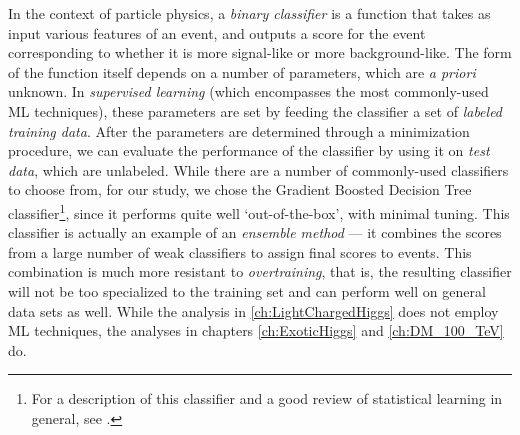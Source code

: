 In the context of particle physics, a \emph{binary classifier} is a function that takes as input various features of an event, and outputs a score for the event corresponding to whether it is more signal-like or more background-like. The form of the function itself depends on a number of parameters, which are \emph{a priori} unknown. In \emph{supervised learning} (which encompasses the most commonly-used ML techniques), these parameters are set by feeding the classifier a set of \emph{labeled training data}. After the parameters are determined through a minimization procedure, we can evaluate the performance of the classifier by using it on \emph{test data}, which are unlabeled. While there are a number of commonly-used classifiers to choose from, for our study, we chose the Gradient Boosted Decision Tree classifier\footnote{For a description of this classifier and a good review of statistical learning in general, see \citep{Hastie:2013}.}, since it performs quite well `out-of-the-box', with minimal tuning. This classifier is actually an example of an \emph{ensemble method} --- it combines the scores from a large number of weak classifiers to assign final scores to events. This combination is much more resistant to \emph{overtraining}, that is, the resulting classifier will not be too specialized to the training set and can perform well on general data sets as well. While the analysis in \autoref{ch:LightChargedHiggs} does not employ ML techniques, the analyses in chapters \ref{ch:ExoticHiggs} and \ref{ch:DM_100_TeV} do.


